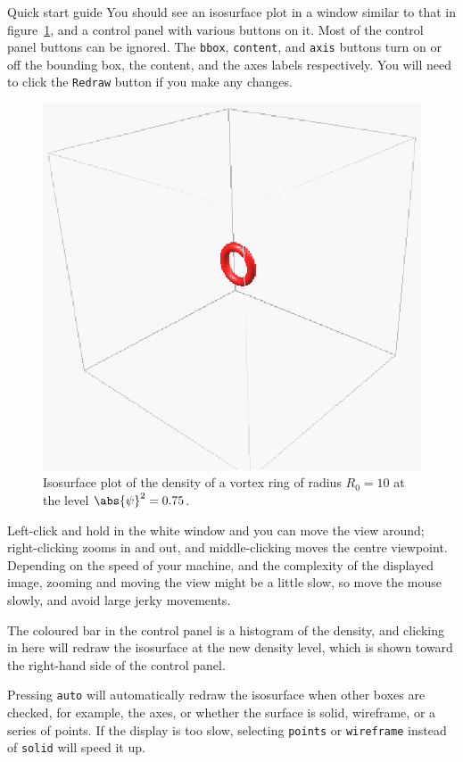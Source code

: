 \begin{chapter}{\label{cha:quickstart} Quick start guide}
  You should see an isosurface plot in a window similar to that in
  figure~\ref{fig:ring_ic_iso}, and a control panel with various buttons on it.
  Most of the control panel buttons can be ignored.  The \verb"bbox",
  \verb"content", and \verb"axis" buttons turn on or off the bounding box, the
  content, and the axes labels respectively.  You will need to click the
  \verb"Redraw" button if you make any changes.
  \begin{figure}
    \centering
    \includegraphics[scale=1]{fig/ring_ic_iso}
    \caption{\label{fig:ring_ic_iso}Isosurface plot of the density of a vortex
      ring of radius $R_{0}=10$ at the level $\abs{\psi}^{2} = 0.75$.}
  \end{figure}
  Left-click and hold in the white window and you can move the view around;
  right-clicking zooms in and out, and middle-clicking moves the centre
  viewpoint.  Depending on the speed of your machine, and the complexity of the
  displayed image, zooming and moving the view might be a little slow, so move
  the mouse slowly, and avoid large jerky movements.

  The coloured bar in the control panel is a histogram of the density, and
  clicking in here will redraw the isosurface at the new density level, which
  is shown toward the right-hand side of the control panel.

  Pressing \verb"auto" will automatically redraw the isosurface when other
  boxes are checked, for example, the axes, or whether the surface is solid,
  wireframe, or a series of points.  If the display is too slow, selecting
  \verb"points" or \verb"wireframe" instead of \verb"solid" will speed it up.


\end{chapter}
